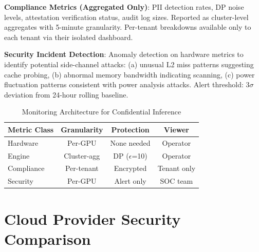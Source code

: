 \documentclass[conference,10pt]{IEEEtran}
\begin{document}
\textbf{Compliance Metrics (Aggregated Only)}: PII detection rates, DP noise levels, attestation verification status, audit log sizes. Reported as cluster-level aggregates with 5-minute granularity. Per-tenant breakdowns available only to each tenant via their isolated dashboard.

\textbf{Security Incident Detection}: Anomaly detection on hardware metrics to identify potential side-channel attacks: (a) unusual L2 miss patterns suggesting cache probing, (b) abnormal memory bandwidth indicating scanning, (c) power fluctuation patterns consistent with power analysis attacks. Alert threshold: 3$\sigma$ deviation from 24-hour rolling baseline.

\begin{table}[!htbp]
\caption{Monitoring Architecture for Confidential Inference}
\label{tab:monitor}
\centering\footnotesize
\begin{tabular}{@{}lccc@{}}
\toprule
\textbf{Metric Class} & \textbf{Granularity} & \textbf{Protection} & \textbf{Viewer} \\
\midrule
Hardware & Per-GPU & None needed & Operator \\
Engine & Cluster-agg & DP ($\epsilon$=10) & Operator \\
Compliance & Per-tenant & Encrypted & Tenant only \\
Security & Per-GPU & Alert only & SOC team \\
\bottomrule
\end{tabular}
\end{table}

\section{Cloud Provider Security Comparison}
\label{sec:cloudcomp}
\end{document}
